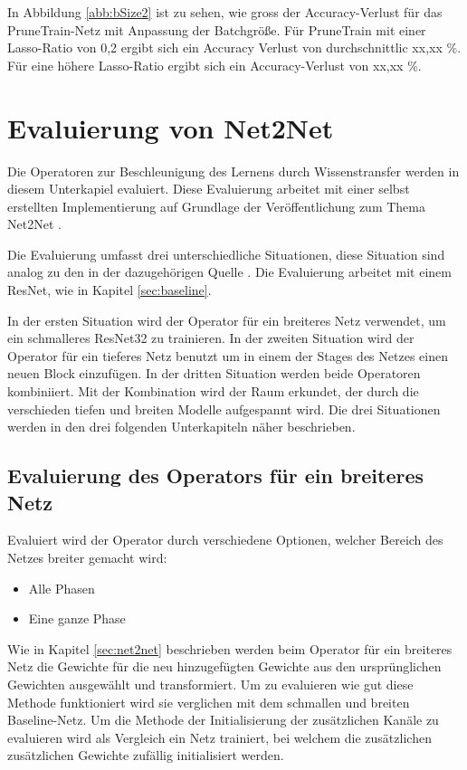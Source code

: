 In Abbildung \ref{abb:bSize2} ist zu sehen, wie gross der Accuracy-Verlust für das PruneTrain-Netz mit Anpassung der Batchgröße. Für PruneTrain mit einer Lasso-Ratio von 0,2 ergibt sich ein Accuracy Verlust von durchschnittlic xx,xx \%. Für eine höhere Lasso-Ratio ergibt sich ein Accuracy-Verlust von xx,xx \%.






\color{black}
\chapter{Evaluierung von Net2Net}\label{sec:net2netexperimente}
Die Operatoren zur Beschleunigung des Lernens durch Wissenstransfer werden in diesem Unterkapiel evaluiert. Diese Evaluierung arbeitet mit einer selbst erstellten Implementierung auf Grundlage der Veröffentlichung zum Thema Net2Net \cite{net2net}.

Die Evaluierung umfasst drei unterschiedliche Situationen, diese Situation sind analog zu den in der dazugehörigen Quelle \cite{net2net}. Die Evaluierung arbeitet mit einem ResNet, wie in Kapitel \ref{sec:baseline}.

In der ersten Situation wird der Operator für ein breiteres Netz verwendet, um ein schmalleres ResNet32 zu trainieren. In der zweiten Situation wird der Operator für ein tieferes Netz benutzt um in einem der Stages des Netzes einen neuen Block einzufügen. In der dritten Situation werden beide Operatoren kombiniiert. Mit der Kombination wird der Raum erkundet, der durch die verschieden tiefen und breiten Modelle aufgespannt wird.
Die drei Situationen werden in den drei folgenden Unterkapiteln näher beschrieben.





\section{Evaluierung des Operators für ein breiteres Netz}
Evaluiert wird der Operator durch verschiedene Optionen, welcher Bereich des Netzes breiter gemacht wird:
\begin{itemize}
 \item Alle Phasen
 \item Eine ganze Phase
\end{itemize}
Wie in Kapitel \ref{sec:net2net} beschrieben werden beim Operator für ein breiteres Netz die Gewichte für die neu hinzugefügten Gewichte aus den ursprünglichen Gewichten ausgewählt und transformiert. Um zu evaluieren wie gut diese Methode funktioniert wird sie verglichen mit dem schmallen und breiten Baseline-Netz. Um die Methode der Initialisierung der zusätzlichen Kanäle zu evaluieren wird als Vergleich ein Netz trainiert, bei welchem die zusätzlichen zusätzlichen Gewichte zufällig initialisiert werden.
\color{blue1}
